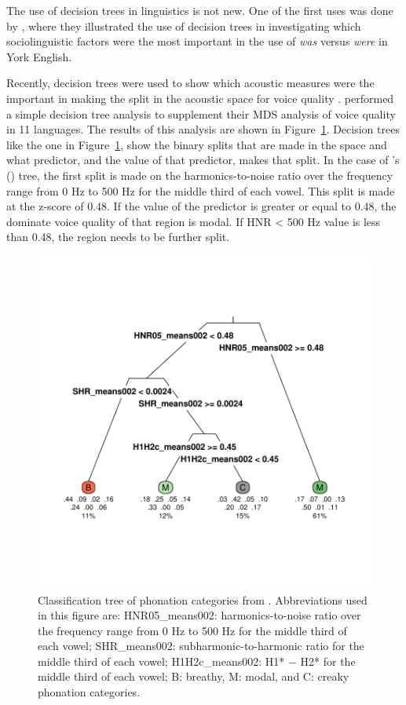 The use of decision trees in linguistics is not new. One of the first uses was done by \citet{tagliamonteModelsForestsTrees2012}, where they illustrated the use of decision trees in investigating which sociolinguistic factors were the most important in the use of \textit{was} versus \textit{were} in York English. 

Recently, decision trees were used to show which acoustic measures were the important in making the split in the acoustic space for voice quality \citep{keatingCrosslanguageAcousticSpace2023}. \citeauthor{keatingCrosslanguageAcousticSpace2023} performed a simple decision tree analysis to supplement their MDS analysis of voice quality in 11 languages. The results of this analysis are shown in Figure~\ref{fig:keating_tree}. Decision trees like the one in Figure~\ref{fig:keating_tree}, show the binary splits that are made in the space and what predictor, and the value of that predictor, makes that split. In the case of \citeauthor{keatingCrosslanguageAcousticSpace2023}'s (\citeyear{keatingCrosslanguageAcousticSpace2023}) tree, the first split is made on the harmonics-to-noise ratio over the frequency range from 0 Hz to 500 Hz for the middle third of each vowel. This split is made at the z-score of 0.48. If the value of the predictor is greater or equal to 0.48, the dominate voice quality of that region is modal. If HNR < 500 Hz value is less than 0.48, the region needs to be further split. 

\begin{figure}[h!]
    \centering
    \includegraphics[width = 0.9\linewidth]{images/keating_tree.pdf}
    \caption{Classification tree of phonation categories from \citet{keatingCrosslanguageAcousticSpace2023}. Abbreviations used in this figure are: {HNR05_means002}: harmonics-to-noise ratio over the frequency range from 0 Hz to 500 Hz for the middle third of each vowel; {SHR_means002}: subharmonic-to-harmonic ratio for the middle third of each vowel; {H1H2c_means002}: H1* − H2* for the middle third of each vowel; B: breathy, M: modal, and C: creaky phonation categories.}
    \label{fig:keating_tree}
\end{figure}

